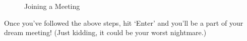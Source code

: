 \documentclass[14pt]{report}
\begin{document}
                            \begin{figure}[t]
                                \centering
                                \qquad
                                \caption{Joining a Meeting}%
                                \label{fig:JoinMeet}%
                            \end{figure}

                            Once you've followed the above steps, hit `Enter' and you'll be a part of your dream meeting! (Just kidding, it could be your worst nightmare.)
\end{document}
